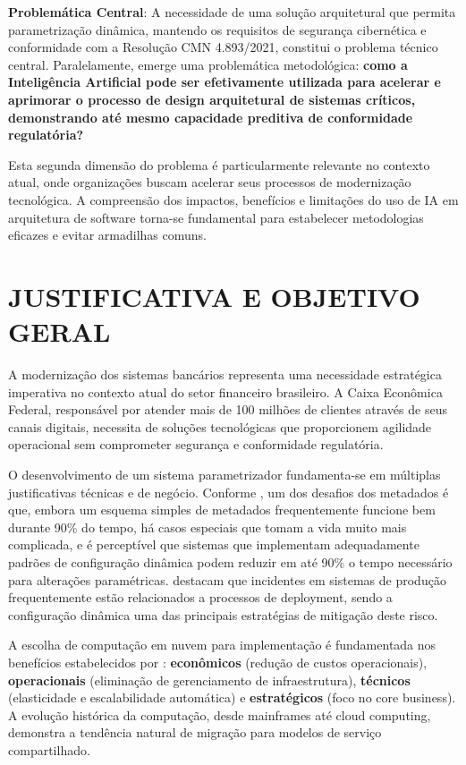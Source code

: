 \textbf{Problemática Central}: A necessidade de uma solução arquitetural que permita parametrização dinâmica, mantendo os requisitos de segurança cibernética e conformidade com a Resolução CMN 4.893/2021, constitui o problema técnico central. Paralelamente, emerge uma problemática metodológica: \textbf{como a Inteligência Artificial pode ser efetivamente utilizada para acelerar e aprimorar o processo de design arquitetural de sistemas críticos, demonstrando até mesmo capacidade preditiva de conformidade regulatória?}

Esta segunda dimensão do problema é particularmente relevante no contexto atual, onde organizações buscam acelerar seus processos de modernização tecnológica. A compreensão dos impactos, benefícios e limitações do uso de IA em arquitetura de software torna-se fundamental para estabelecer metodologias eficazes e evitar armadilhas comuns.

\chapter{JUSTIFICATIVA E OBJETIVO GERAL}

A modernização dos sistemas bancários representa uma necessidade estratégica imperativa no contexto atual do setor financeiro brasileiro. A Caixa Econômica Federal, responsável por atender mais de 100 milhões de clientes através de seus canais digitais, necessita de soluções tecnológicas que proporcionem agilidade operacional sem comprometer segurança e conformidade regulatória.

O desenvolvimento de um sistema parametrizador fundamenta-se em múltiplas justificativas técnicas e de negócio. Conforme , um dos desafios dos metadados é que, embora um esquema simples de metadados frequentemente funcione bem durante 90\% do tempo, há casos especiais que tomam a vida muito mais complicada, e é perceptível que sistemas que implementam adequadamente padrões de configuração dinâmica podem reduzir em até 90\% o tempo necessário para alterações paramétricas.  destacam que incidentes em sistemas de produção frequentemente estão relacionados a processos de deployment, sendo a configuração dinâmica uma das principais estratégias de mitigação deste risco.

A escolha de computação em nuvem para implementação é fundamentada nos benefícios estabelecidos por : \textbf{econômicos} (redução de custos operacionais), \textbf{operacionais} (eliminação de gerenciamento de infraestrutura), \textbf{técnicos} (elasticidade e escalabilidade automática) e \textbf{estratégicos} (foco no core business). A evolução histórica da computação, desde mainframes até cloud computing, demonstra a tendência natural de migração para modelos de serviço compartilhado.

